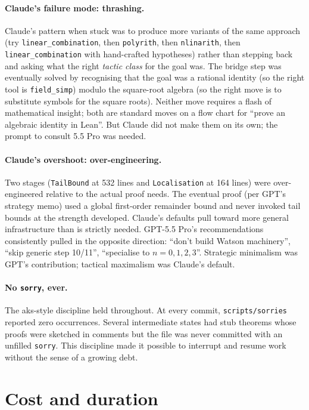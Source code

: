 \documentclass[11pt]{article}
\begin{document}
\paragraph{Claude's failure mode: thrashing.} Claude's pattern when
stuck was to produce more variants of the same approach (try
\texttt{linear\_combination}, then \texttt{polyrith}, then
\texttt{nlinarith}, then \texttt{linear\_combination} with hand-crafted
hypotheses) rather than stepping back and asking what the right
\emph{tactic class} for the goal was. The bridge step was eventually
solved by recognising that the goal was a rational identity (so the
right tool is \texttt{field\_simp}) modulo the square-root algebra (so
the right move is to substitute symbols for the square roots). Neither
move requires a flash of mathematical insight; both are standard moves
on a flow chart for ``prove an algebraic identity in Lean''. But Claude
did not make them on its own; the prompt to consult 5.5 Pro was needed.

\paragraph{Claude's overshoot: over-engineering.} Two stages
(\texttt{TailBound} at 532 lines and \texttt{Localisation} at 164 lines)
were over-engineered relative to the actual proof needs. The eventual
proof (per GPT's strategy memo) used a global first-order remainder bound
and never invoked tail bounds at the strength developed. Claude's
defaults pull toward more general infrastructure than is strictly needed.
GPT-5.5 Pro's recommendations consistently pulled in the opposite
direction: ``don't build Watson machinery'', ``skip generic step 10/11'',
``specialise to $n = 0,1,2,3$''. Strategic minimalism was GPT's
contribution; tactical maximalism was Claude's default.

\paragraph{No \texttt{sorry}, ever.} The aks-style discipline held
throughout. At every commit, \texttt{scripts/sorries} reported zero
occurrences. Several intermediate states had stub theorems whose proofs
were sketched in comments but the file was never committed with an
unfilled \texttt{sorry}. This discipline made it possible to interrupt
and resume work without the sense of a growing debt.

\section{Cost and duration}\label{sec:cost}
\end{document}
